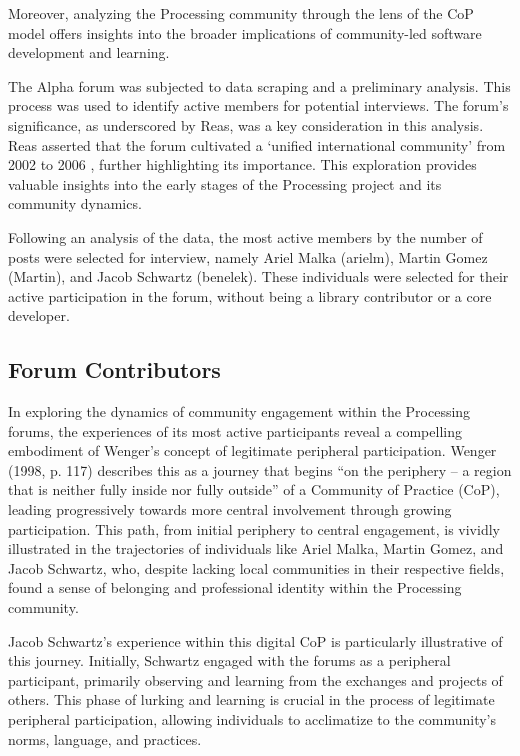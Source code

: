 Moreover, analyzing the Processing community through the lens of the CoP model offers insights into the broader implications of community-led software development and learning. 

The Alpha forum was subjected to data scraping and a preliminary analysis. This process was used to identify active members for potential interviews. The forum’s significance, as underscored by Reas, was a key consideration in this analysis. Reas asserted that the forum cultivated a ‘unified international community’ from 2002 to 2006 \parencite[331]{conradGraphicDesignPostdigital2021}, further highlighting its importance. This exploration provides valuable insights into the early stages of the Processing project and its community dynamics.

Following an analysis of the data, the most active members by the number of posts were selected for interview, namely Ariel Malka (arielm), Martin Gomez (Martin), and Jacob Schwartz (benelek). These individuals were selected for their active participation in the forum, without being a library contributor or a core developer. 

\subsection{Forum Contributors}

In exploring the dynamics of community engagement within the Processing forums, the experiences of its most active participants reveal a compelling embodiment of Wenger's concept of legitimate peripheral participation. Wenger (1998, p. 117) describes this as a journey that begins “on the periphery – a region that is neither fully inside nor fully outside” of a Community of Practice (CoP), leading progressively towards more central involvement through growing participation. This path, from initial periphery to central engagement, is vividly illustrated in the trajectories of individuals like Ariel Malka, Martin Gomez, and Jacob Schwartz, who, despite lacking local communities in their respective fields, found a sense of belonging and professional identity within the Processing community.

Jacob Schwartz’s experience within this digital CoP is particularly illustrative of this journey. Initially, Schwartz engaged with the forums as a peripheral participant, primarily observing and learning from the exchanges and projects of others. This phase of lurking and learning is crucial in the process of legitimate peripheral participation, allowing individuals to acclimatize to the community's norms, language, and practices.

